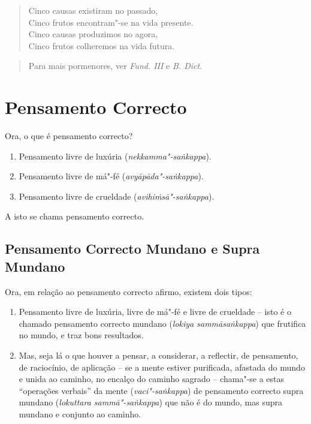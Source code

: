 \begin{verse}
  Cinco causas existiram no passado,\\
  Cinco frutos encontram"-se na vida presente.\\
  Cinco causas produzimos no agora,\\
  Cinco frutos colheremos na vida futura. 
\end{verse}

\begin{quote}
  Para mais pormenores, ver \emph{Fund. III} e \emph{B. Dict.}
\end{quote}

\clearpage

\section{Pensamento Correcto}



Ora, o que é pensamento correcto?

\begin{enumerate}

  \item Pensamento livre de luxúria (\emph{nekkamma"-saṅkappa}).
  \item Pensamento livre de má"-fé (\emph{avyāpāda"-saṅkappa}).
  \item Pensamento livre de crueldade (\emph{avihiṁsā"-saṅkappa}).

\end{enumerate}

A isto se chama pensamento correcto.


\subsection{Pensamento Correcto Mundano e Supra Mundano}

Ora, em relação ao pensamento correcto afirmo, existem dois tipos:

\begin{enumerate}

  \item Pensamento livre de luxúria, livre de má"-fé e livre de crueldade -- isto
        é o chamado pensamento correcto mundano (\emph{lokiya sammāsaṅkappa})
        que frutifica no mundo, e traz bons resultados.

  \item Mas, seja lá o que houver a pensar, a considerar, a reflectir, de
        pensamento, de raciocínio, de aplicação -- se a mente estiver
        purificada, afastada do mundo e unida ao caminho, no encalço do caminho
        sagrado -- chama"-se a estas “operações verbais” da mente (\emph{vaci"-saṅkappa}) de pensamento correcto supra mundano (\emph{lokuttara
        sammā"-saṅkappa}) que não é do mundo, mas supra mundano e conjunto ao
        caminho.

\end{enumerate}

